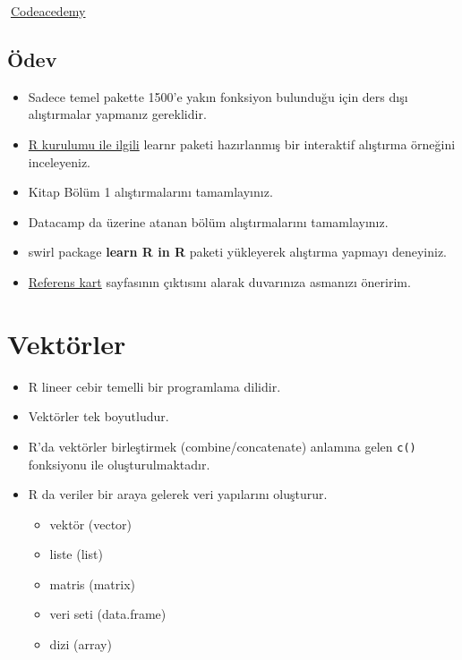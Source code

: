 \documentclass[
  oneside]{book}
\providecommand{\tightlist}{%
  \setlength{\itemsep}{0pt}\setlength{\parskip}{0pt}}
\begin{document}
\begin{try}
🔗\href{https://www.codecademy.com/learn}{Codeacedemy}

\end{try}

\hypertarget{uxf6dev-1}{%
\section{Ödev}\label{uxf6dev-1}}

\begin{itemize}
\item
  Sadece temel pakette 1500'e yakın fonksiyon bulunduğu için ders dışı alıştırmalar yapmanız gereklidir.
\item
  \href{https://learnr-examples.shinyapps.io/ex-setup-r/}{R kurulumu ile ilgili} learnr paketi hazırlanmış bir interaktif alıştırma örneğini inceleyeniz.
\item
  Kitap Bölüm 1 alıştırmalarını tamamlayınız.
\item
  Datacamp da üzerine atanan bölüm alıştırmalarını tamamlayınız.
\item
  swirl package \textbf{learn R in R} paketi yükleyerek alıştırma yapmayı deneyiniz.
\item
  \href{https://cran.r-project.org/doc/contrib/Short-refcard.pdf}{Referens kart} sayfasının çıktısını alarak duvarınıza asmanızı öneririm.
\end{itemize}

\hypertarget{vektuxf6rler}{%
\chapter{Vektörler}\label{vektuxf6rler}}

\begin{itemize}
\item
  R lineer cebir temelli bir programlama dilidir.
\item
  Vektörler tek boyutludur.
\item
  R'da vektörler birleştirmek (combine/concatenate) anlamına gelen \texttt{c()} fonksiyonu ile oluşturulmaktadır.
\item
  R da veriler bir araya gelerek veri yapılarını oluşturur.

  \begin{itemize}
  \tightlist
  \item
    vektör (vector)
  \item
    liste (list)
  \item
    matris (matrix)
  \item
    veri seti (data.frame)
  \item
    dizi (array)
  \end{itemize}
\end{itemize}
\end{document}
